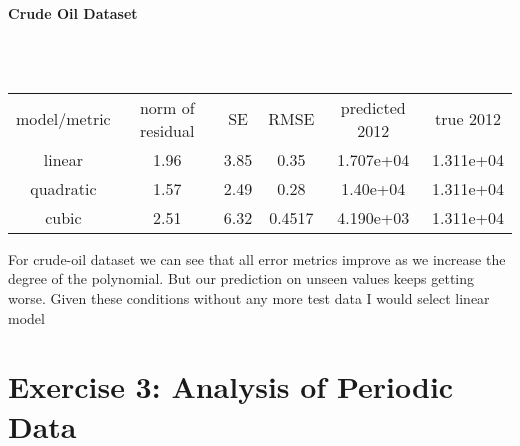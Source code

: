 \documentclass[unicode,11pt,a4paper,oneside,numbers=endperiod,openany]{scrartcl}
\begin{document}
\begin{itemize}
    \begin{center}
    {\bf{Crude Oil Dataset}}
    \end{center}
    \\
    \\
    \begin{center}
        \begin{tabular}{ c c c c c c}
         model/metric & norm of residual & SE & RMSE & predicted 2012 & true 2012\\ 
         linear & 1.96 & 3.85 & 0.35 & 1.707e+04 & 1.311e+04\\ 
         quadratic & 1.57 & 2.49 & 0.28 & 1.40e+04 & 1.311e+04\\  
         cubic & 2.51 & 6.32  & 0.4517 & 4.190e+03 & 1.311e+04
        \end{tabular}
    \end{center}
    
    {For crude-oil dataset we can see that all error metrics improve as we increase the degree of the polynomial. But our prediction on unseen values keeps getting worse.
    Given these conditions without any more test data I would select linear model}
\end{itemize}


\section*{Exercise 3: Analysis of Periodic Data}
\end{document}
